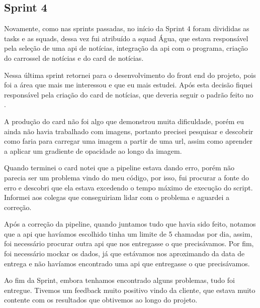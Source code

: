 \subsection{Sprint 4}

Novamente, como nas sprints passadas, no início da Sprint 4 foram divididas 
as tasks e as squads, dessa vez fui atribuído a squad Água, que estava responsável 
pela seleção de uma \ac{api} de notícias, integração da \ac{api} com 
o programa, criação do carrossel de notícias e do card de notícias.

Nessa última sprint retornei para o desenvolvimento do front end do projeto, 
pois foi a área que mais me interessou e que eu mais estudei. Após esta decisão fiquei 
responsável pela criação do card de notícias, que deveria seguir o padrão feito no 
\cite{figma}. 

A produção do card não foi algo que demonstrou muita dificuldade, porém eu 
ainda não havia trabalhado com imagens, portanto precisei pesquisar e descobrir 
como faria para carregar uma imagem a partir de uma \ac{url}, assim como aprender a aplicar um gradiente de opacidade ao longo da imagem.

Quando terminei o card notei que a pipeline estava dando erro, porém não 
parecia ser um problema vindo do meu código, por isso, fui procurar a fonte do 
erro e descobri que ela estava excedendo o tempo máximo de execução do script. 
Informei aos colegas que conseguiriam lidar com o problema e aguardei a correção.

Após a correção da pipeline, quando juntamos tudo que havia sido feito, 
notamos que a \ac{api} que havíamos escolhido tinha um limite de 5 chamadas por dia, 
assim, foi necessário procurar outra \ac{api} que nos entregasse o que precisávamos. Por 
fim, foi necessário mockar os dados, já que estávamos nos aproximando da data de 
entrega e não havíamos encontrado uma \ac{api} que entregasse o que precisávamos. 

Ao fim da Sprint, embora tenhamos encontrado alguns problemas, tudo foi 
entregue. Tivemos um feedback muito positivo vindo da cliente, que estava muito 
contente com os resultados que obtivemos ao longo do projeto. 